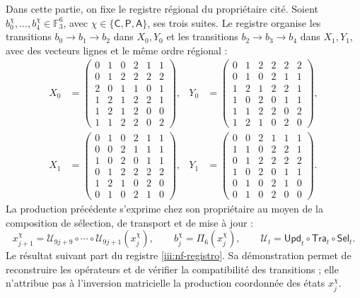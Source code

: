 Dans cette partie, on fixe le registre régional du propriétaire cité.
Soient $b_0^\chi,\ldots,b_4^\chi\in\mathbb F_3^6$, avec
$\chi\in\{\mathsf C,\mathsf P,\mathsf A\}$, ses trois suites.
Le registre organise les transitions $b_0\to b_1\to b_2$ dans
$X_0,Y_0$ et les transitions $b_2\to b_3\to b_4$ dans $X_1,Y_1$,
avec des vecteurs lignes et le même ordre régional :
\begingroup\small
\begin{equation}
\begin{aligned}
X_0&=\begin{pmatrix}
0&1&0&2&1&1\\0&1&2&2&2&2\\2&0&1&1&0&1\\
1&2&1&2&2&1\\1&2&1&2&0&0\\1&1&2&2&0&2
\end{pmatrix},&
Y_0&=\begin{pmatrix}
0&1&2&2&2&2\\0&1&0&2&1&1\\1&2&1&2&2&1\\
1&0&2&0&1&1\\1&1&2&2&0&2\\1&2&1&0&2&0
\end{pmatrix},\\[1ex]
X_1&=\begin{pmatrix}
0&1&0&2&1&1\\0&0&2&1&1&1\\1&0&2&0&1&1\\
0&1&2&2&2&2\\1&2&1&0&2&0\\0&1&0&2&1&0
\end{pmatrix},&
Y_1&=\begin{pmatrix}
0&0&2&1&1&1\\1&1&0&2&2&1\\0&1&2&2&2&2\\
1&0&2&0&1&1\\0&1&0&2&1&0\\0&1&0&2&0&0
\end{pmatrix}.
\end{aligned}
\label{iii:nf-registro}
\end{equation}
\endgroup
La production précédente s’exprime chez son propriétaire au moyen de la
composition de sélection, de transport et de mise à jour :
\[
 x_{j+1}^{\chi}
 =\mathcal U_{9j+9}\circ\cdots\circ\mathcal U_{9j+1}(x_j^{\chi}),
 \qquad b_j^\chi=\Pi_6(x_j^\chi),
 \qquad\mathcal U_t=\mathsf{Upd}_t\circ\mathsf{Tra}_t\circ\mathsf{Sel}_t.
\]
Le résultat suivant part du registre \eqref{iii:nf-registro}.
Sa démonstration permet de reconstruire les opérateurs et de vérifier la
compatibilité des transitions ; elle n’attribue pas à l’inversion matricielle
la production coordonnée des états $x_j^\chi$.

